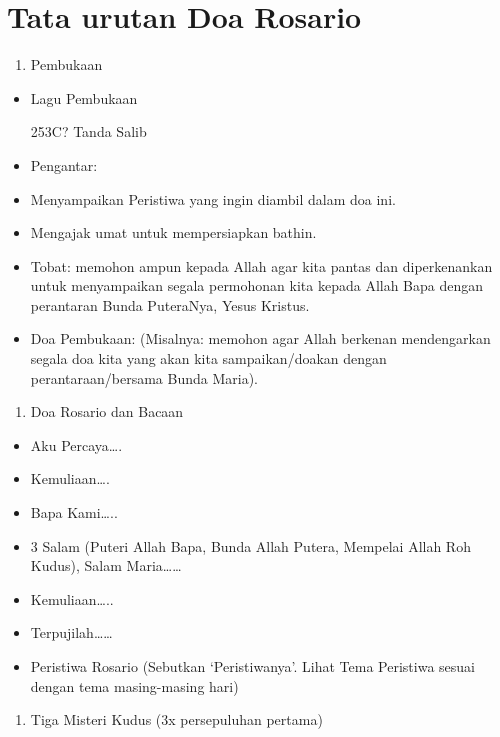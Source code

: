 \documentclass{article}
\begin{document}
\section[Tata urutan Doa Rosario]{Tata urutan Doa Rosario}
\begin{enumerate}
\item Pembukaan
\end{enumerate}
\begin{itemize}
\item Lagu Pembukaan
\item [253C?] Tanda Salib
\item Pengantar:\ \ 
\end{itemize}
\begin{itemize}
\item Menyampaikan Peristiwa yang ingin diambil dalam doa ini.
\item Mengajak umat untuk mempersiapkan bathin.
\end{itemize}
\begin{itemize}
\item Tobat: memohon ampun kepada Allah agar kita pantas dan
diperkenankan untuk menyampaikan segala permohonan kita kepada Allah
Bapa dengan perantaran Bunda PuteraNya, Yesus Kristus.
\item Doa Pembukaan: (Misalnya: memohon agar Allah berkenan mendengarkan
segala doa kita yang akan kita sampaikan/doakan dengan
perantaraan/bersama Bunda Maria).
\end{itemize}
\begin{enumerate}
\item Doa Rosario dan Bacaan
\end{enumerate}
\begin{itemize}
\item Aku Percaya{\dots}.
\item Kemuliaan{\dots}.
\item Bapa Kami{\dots}..
\item 3 Salam (Puteri Allah Bapa, Bunda Allah Putera, Mempelai Allah Roh
Kudus), Salam Maria{\dots}{\dots}
\item Kemuliaan{\dots}..
\item Terpujilah{\dots}{\dots}
\item Peristiwa Rosario (Sebutkan
{\textquoteleft}Peristiwanya{\textquoteright}. Lihat Tema Peristiwa
sesuai dengan tema masing-masing hari)
\end{itemize}
\begin{enumerate}
\item Tiga Misteri Kudus (3x persepuluhan pertama)
\end{enumerate}
\end{document}
